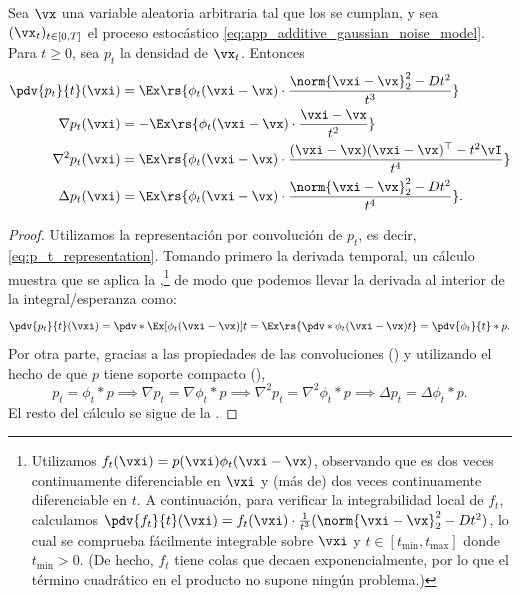 \documentclass[../../book-main_es.tex]{subfiles}
\begin{document}
\begin{proposition}\label{prop:p_t_derivatives}
    Sea \(\vx\) una variable aleatoria arbitraria tal que los
    se cumplan, y sea \((\vx_{t})_{t \in [0, T]}\) el proceso estocástico
    \eqref{eq:app_additive_gaussian_noise_model}. Para \(t
    \geq 0\), sea \(p_{t}\) la densidad de \(\vx_{t}\). Entonces
    \begin{align}
        \pdv{p_{t}}{t}(\vxi)
        &= \Ex\rs{\phi_{t}(\vxi - \vx)\cdot\frac{\norm{\vxi -
        \vx}_{2}^{2} - Dt^{2}}{t^{3}}} \\
        \nabla p_{t}(\vxi)
        &= -\Ex\rs{\phi_{t}(\vxi - \vx)\cdot\frac{\vxi - \vx}{t^{2}}} \\
        \nabla^{2}p_{t}(\vxi)
        &= \Ex\rs{\phi_{t}(\vxi - \vx)\cdot\frac{(\vxi - \vx)(\vxi -
        \vx)^{\top} - t^{2}\vI}{t^{4}}} \\
        \Delta p_{t}(\vxi)
        &= \Ex\rs{\phi_{t}(\vxi - \vx)\cdot\frac{\norm{\vxi -
        \vx}_{2}^{2} - Dt^{2}}{t^{4}}}.
    \end{align}
\end{proposition}
\begin{proof}
    Utilizamos la representación por convolución de \(p_{t}\), es decir,
    \eqref{eq:p_t_representation}. Tomando primero la derivada temporal,
    un cálculo muestra que se aplica la ,\footnote{Utilizamos
        \(f_{t}(\vxi) = p(\vxi) \phi_{t}(\vxi - \vx)\), observando que
        es dos veces continuamente diferenciable en \(\vxi\) y (más
        de) dos veces continuamente diferenciable en \(t\). A continuación, para verificar
        la integrabilidad local de \(f_{t}\), calculamos
        \(\pdv{f_{t}}{t}(\vxi) = f_{t}(\vxi)\cdot
        \frac{1}{t^{3}}(\norm{\vxi - \vx}_{2}^{2} - Dt^{2})\), lo cual se comprueba
        fácilmente integrable sobre \(\vxi\) y \(t \in [t_{\min},
        t_{\max}]\) donde \(t_{\min} > 0\). (De hecho, \(f_{t}\) tiene
            colas que decaen exponencialmente, por lo que el término cuadrático en el
    producto no supone ningún problema.)} de modo que podemos llevar la derivada al interior
    de la integral/esperanza como:
    \begin{equation}
        \pdv{p_{t}}{t}(\vxi) = \pdv*{\Ex[\phi_{t}(\vxi - \vx)]}{t} =
        \Ex\rs{\pdv*{\phi_{t}(\vxi - \vx)}{t}} = \pdv{\phi_{t}}{t} * p.
    \end{equation}
    Por otra parte, gracias a las propiedades de las convoluciones
    () y utilizando el hecho de que \(p\) tiene
    soporte compacto (),
    \begin{equation}
        p_{t} = \phi_{t} * p \implies \nabla p_{t} = \nabla \phi_{t}
        * p \implies \nabla^{2}p_{t} = \nabla^{2}\phi_{t} * p
        \implies \Delta p_{t} = \Delta \phi_{t} * p.
    \end{equation}
    El resto del cálculo se sigue de la .
\end{proof}
\end{document}
